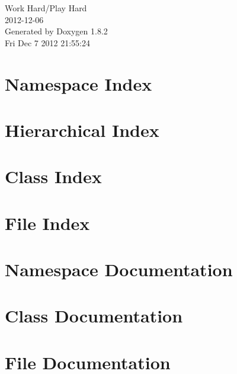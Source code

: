 \documentclass{book}
\begin{document}
\hypersetup{pageanchor=false,citecolor=blue}
\begin{titlepage}
\vspace*{7cm}
\begin{center}
{\Large Work Hard/\-Play Hard \\[1ex]\large 2012-\/12-\/06 }\\
\vspace*{1cm}
{\large Generated by Doxygen 1.8.2}\\
\vspace*{0.5cm}
{\small Fri Dec 7 2012 21:55:24}\\
\end{center}
\end{titlepage}
\clearemptydoublepage
{}
\tableofcontents
\clearemptydoublepage
{}
\hypersetup{pageanchor=true,citecolor=blue}
\chapter{Namespace Index}

\chapter{Hierarchical Index}

\chapter{Class Index}

\chapter{File Index}

\chapter{Namespace Documentation}

\chapter{Class Documentation}















\chapter{File Documentation}








\printindex
\end{document}

